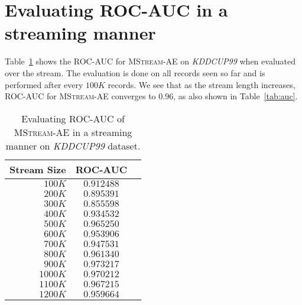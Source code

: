 \documentclass[sigconf]{acmart}
\newcommand{\method}{\textsc{MStream}}
\begin{document}
\section{Evaluating ROC-AUC in a streaming manner}
\label{app:4}
Table~\ref{tab:streamingauc} shows the ROC-AUC for \method-AE on \emph{KDDCUP99} when evaluated over the stream. The evaluation is done on all records seen so far and is performed after every $100K$ records. We see that as the stream length increases, ROC-AUC for \method-AE converges to $0.96$, as also shown in Table~\ref{tab:auc}.



\begin{table}[H]
\centering
\caption{Evaluating ROC-AUC of \method-AE in a streaming manner on \emph{KDDCUP99} dataset.}
\label{tab:streamingauc}
\begin{tabular}{@{}rcc@{}}
\toprule
	Stream Size & ROC-AUC \\ \midrule
 $100K$ & $0.912488$ \\
        $200K$ & $0.895391$ \\
        $300K$ & $0.855598$ \\
        $400K$ & $0.934532$ \\
        $500K$ & $0.965250$ \\
        $600K$ & $0.953906$ \\
        $700K$ & $0.947531$ \\
        $800K$ & $0.961340$ \\
        $900K$ & $0.973217$ \\
        $1000K$ & $0.970212$ \\
        $1100K$ & $0.967215$ \\
        $1200K$ & $0.959664$ \\
\bottomrule
\end{tabular}
\end{table}
\end{document}
